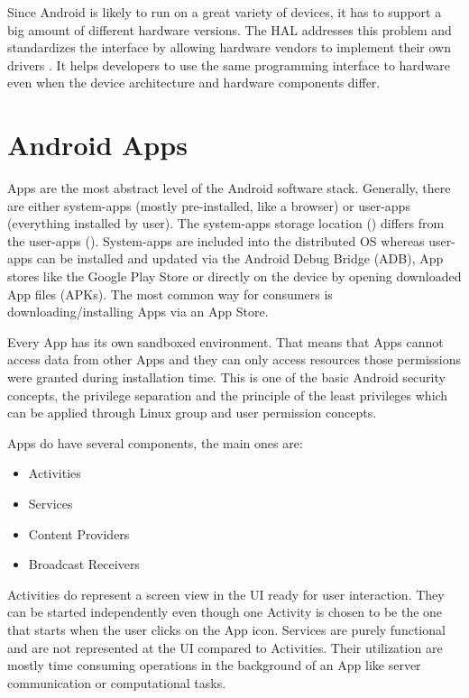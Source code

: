 Since Android is likely to run on a great variety of devices,
it has to support a big amount of different hardware versions.
The HAL addresses this problem and
standardizes the interface by allowing hardware vendors
to implement their own drivers \parencite[p.18f]{levin}. It helps
developers to use the same programming interface to hardware even when the
device architecture and hardware components differ.

\section{Android Apps}\label{section:android_apps}
Apps are the most abstract level of the Android software stack.
Generally, there are either system-apps (mostly pre-installed, like a browser)
or user-apps (everything installed by user).
The system-apps storage location () differs from
the user-apps (). System-apps are included into the
distributed OS whereas user-apps can be installed and updated
via the Android Debug Bridge (ADB), App stores
like the Google Play Store or directly on the device by opening
downloaded App files (APKs). The most common way for consumers is
downloading/installing Apps via an App Store.

Every App has its own sandboxed environment. That means that
Apps cannot access data from other Apps and they can only access
resources those permissions were granted during installation time.
This is one of the basic Android security concepts,
the privilege separation and the principle of the least
privileges \parencite[ch.1]{securityinternals} which can be applied through
Linux group and user permission concepts.

Apps do have several components, the main ones are:

\begin{itemize}
\item Activities
\item Services
\item Content Providers
\item Broadcast Receivers
\end{itemize}

Activities do represent a screen view in the UI ready for user
interaction. They can be started independently even though one Activity
is chosen to be the one that starts when the user clicks on the
App icon. Services are purely functional and are not represented
at the UI compared to Activities. Their utilization are mostly time
consuming operations in the background of an App like server
communication or computational tasks.

